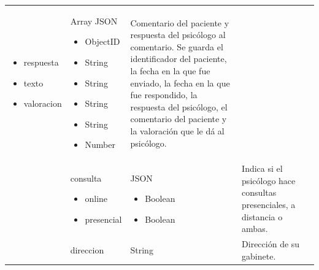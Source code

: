\begin{table}[htpb]
\begin{tabularx}{\textwidth}{|l|X|X|X|X|}
\begin{itemize}
                                     \item respuesta
                                     \item texto
                                     \item valoracion
                                     \end{itemize} & Array JSON \begin{itemize}
             \item ObjectID
             \item String 
             \item String 
             \item String                 
             \item String
             \item Number
\end{itemize}                         & Comentario del paciente y respuesta del psicólogo al comentario. Se guarda el identificador del paciente, la fecha en la que fue enviado, la fecha en la que fue respondido, la respuesta del psicólogo, el comentario del paciente y la valoración que le dá al psicólogo. \\ \cline{2-4} 
                                     & consulta \begin{itemize}
                                     \item online
                                     \item presencial                                                                
\end{itemize}                        & JSON \begin{itemize}
\item Boolean
\item Boolean                                          
\end{itemize}   & Indica si el psicólogo hace consultas presenciales, a distancia o ambas.                                                                                                                                                                                                    \\ \cline{2-4} 
                                     & direccion                                                                                      & String                                                             & Dirección de su gabinete.                                                                                                                                                                                                                                                   \\ \cline{2-4} 

\end{tabularx}
\end{table}
